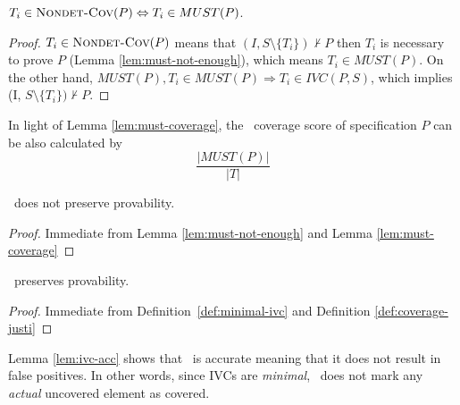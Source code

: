 \begin{lemma}
  \label{lem:must-coverage}
$T_i \in \text{\sc Nondet-Cov} (P) \Leftrightarrow T_i \in MUST(P)$.
\end{lemma}
\begin{proof}
$T_i \in \text{\sc Nondet-Cov} (P)$ means that $(I, S \setminus \{ T_i \}) \nvdash P$ then $T_i$ is necessary to prove $P$ (Lemma \ref{lem:must-not-enough}), which means $T_i \in MUST(P)$.
On the other hand, $MUST(P), T_i \in MUST (P) \Rightarrow T_i \in IVC(P, S)$,
which implies (I, $S \setminus \{ T_i \}) \nvdash P$.
\end{proof}
\vspace{2mm}

In light of Lemma \ref{lem:must-coverage}, the \nondetcov\ coverage score of specification $P$ can be also calculated by
$$\frac{|MUST(P)|}{|T|}$$
\vspace{0.2in}


%
\begin{coroll}
\label{cor:must-not-provable}
\nondetcov\ does not preserve provability.
\end{coroll}
\begin{proof}
Immediate from Lemma \ref{lem:must-not-enough} and Lemma \ref{lem:must-coverage}
\end{proof}
\vspace{2mm}
\begin{coroll}
\label{cor:ivc-provable}
\ivccov\ preserves provability.
\end{coroll}
\begin{proof}
Immediate from Definition~\ref{def:minimal-ivc} and Definition \ref{def:coverage-justi}
\end{proof}
\vspace{2mm}

Lemma \ref{lem:ivc-acc} shows that \ivccov\ is accurate meaning that it does not result in false positives. In other words, since IVCs are \emph{minimal}, \ivccov\ does not mark
any \emph{actual} uncovered element as covered.


